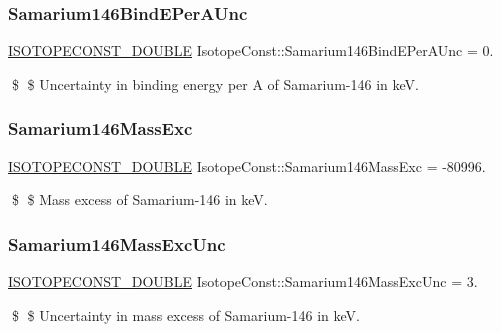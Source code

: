 \subsubsection{\texorpdfstring{Samarium146\+Bind\+E\+Per\+A\+Unc}{Samarium146BindEPerAUnc}}
{\footnotesize\ttfamily \mbox{\hyperlink{group___isotope_const-_macros_ga8f45a7272ce02c0b4c65c44636ed719a}{I\+S\+O\+T\+O\+P\+E\+C\+O\+N\+S\+T\+\_\+\+D\+O\+U\+B\+LE}} Isotope\+Const\+::\+Samarium146\+Bind\+E\+Per\+A\+Unc = 0.}

\$ \$ Uncertainty in binding energy per A of Samarium-\/146 in keV. \mbox{\label{group___isotope_const-_samarium-_sm146_ga35f72472f3eb8d8722c2fa49374870a0}} 
\subsubsection{\texorpdfstring{Samarium146\+Mass\+Exc}{Samarium146MassExc}}
{\footnotesize\ttfamily \mbox{\hyperlink{group___isotope_const-_macros_ga8f45a7272ce02c0b4c65c44636ed719a}{I\+S\+O\+T\+O\+P\+E\+C\+O\+N\+S\+T\+\_\+\+D\+O\+U\+B\+LE}} Isotope\+Const\+::\+Samarium146\+Mass\+Exc = -\/80996.}

\$ \$ Mass excess of Samarium-\/146 in keV. \mbox{\label{group___isotope_const-_samarium-_sm146_ga5b919d73732fe20d9ca60533457b18a7}} 
\subsubsection{\texorpdfstring{Samarium146\+Mass\+Exc\+Unc}{Samarium146MassExcUnc}}
{\footnotesize\ttfamily \mbox{\hyperlink{group___isotope_const-_macros_ga8f45a7272ce02c0b4c65c44636ed719a}{I\+S\+O\+T\+O\+P\+E\+C\+O\+N\+S\+T\+\_\+\+D\+O\+U\+B\+LE}} Isotope\+Const\+::\+Samarium146\+Mass\+Exc\+Unc = 3.}

\$ \$ Uncertainty in mass excess of Samarium-\/146 in keV. \mbox{\label{group___isotope_const-_samarium-_sm146_ga713ba3808e9002f34e60dc88c1a12ca5}} 
